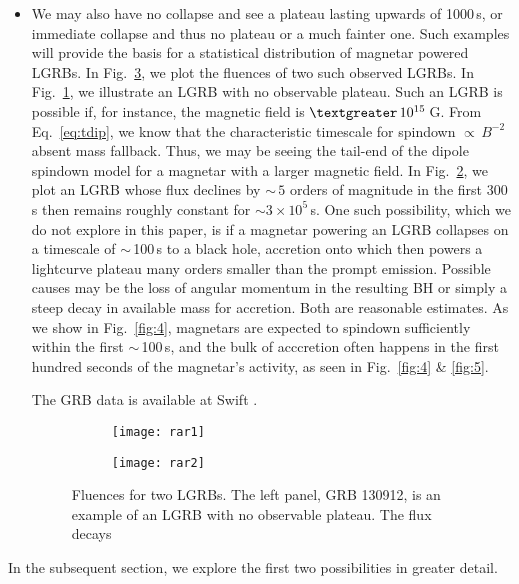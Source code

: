\documentclass{article}
\begin{document}
\begin{itemize}
\item We may also have no collapse and see a plateau lasting upwards of 1000\,s, or immediate collapse and thus no plateau or a much fainter one. Such examples will provide the basis for a statistical distribution of magnetar powered LGRBs. In Fig.~\ref{fig:rar}, we plot the fluences of two such observed LGRBs. In Fig.~\ref{fig:rar1}, we illustrate an LGRB with no observable plateau. Such an LGRB is possible if, for instance, the magnetic field is $\textgreater\,10^{15}$\,G. From Eq.~\ref{eq:tdip}, we know that the characteristic timescale for spindown $\propto\,B^{-2}$ absent mass fallback. Thus, we may be seeing the tail-end of the dipole spindown model for a magnetar with a larger magnetic field. In Fig.~\ref{fig:rar2}, we plot an LGRB whose flux declines by $\sim\,5$ orders of magnitude in the first 300\,s then remains roughly constant for $\sim 3\times 10^{5}$\,s. One such possibility, which we do not explore in this paper, is if a magnetar powering an LGRB collapses on a timescale of $\sim$\,100\,s to a black hole, accretion onto which then powers a lightcurve plateau many orders smaller than the prompt emission. Possible causes may be the loss of angular momentum in the resulting BH or simply a steep decay in available mass for accretion. Both are reasonable estimates. As we show in Fig.~\ref{fig:4}, magnetars are expected to spindown sufficiently within the first $\sim$\,100\,s, and the bulk of acccretion often happens in the first hundred seconds of the magnetar's activity, as seen in Fig.~\ref{fig:4} \& \ref{fig:5}.

 The GRB data is available at Swift \cite{swift}.

\begin{figure}[h!]
\centering
\begin{subfigure}{.55\textwidth}
\centering
\texttt{[image: rar1]}
\caption{}
\label{fig:rar1}
\end{subfigure}%
\begin{subfigure}{.55\textwidth}
\centering
\texttt{[image: rar2]}
\caption{}
\label{fig:rar2}
\end{subfigure}
\caption{Fluences for two LGRBs. The left panel, GRB 130912, is an example of an LGRB with no observable plateau. The flux decays }
\label{fig:rar}
\end{figure}
\end{itemize}


In the subsequent section, we explore the first two possibilities in greater detail.
\end{document}
